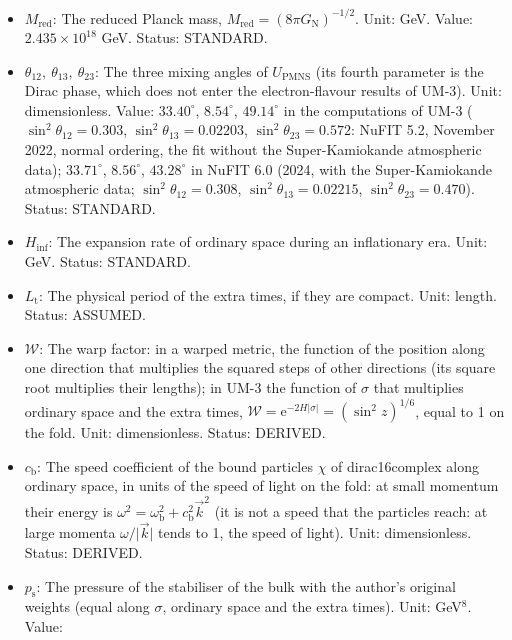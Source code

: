 \documentclass[
  10pt,
]{article}
\providecommand{\tightlist}{%
  \setlength{\itemsep}{0pt}\setlength{\parskip}{0pt}}
\begin{document}
\begin{itemize}
\tightlist
\item
  \(M_{\mathrm{red}}\): The reduced Planck mass,
  \(M_{\mathrm{red}} = (8\pi G_{\mathrm{N}})^{-1/2}\). Unit: GeV. Value:
  \(2.435\times10^{18}\) GeV. Status: STANDARD.
\item
  \(\theta_{12},\ \theta_{13},\ \theta_{23}\): The three mixing angles
  of \(U_{\mathrm{PMNS}}\) (its fourth parameter is the Dirac phase,
  which does not enter the electron-flavour results of UM-3). Unit:
  dimensionless. Value: \(33.40^\circ\), \(8.54^\circ\), \(49.14^\circ\)
  in the computations of UM-3 (\(\sin^2\theta_{12} = 0.303\),
  \(\sin^2\theta_{13} = 0.02203\), \(\sin^2\theta_{23} = 0.572\): NuFIT
  5.2, November 2022, normal ordering, the fit without the
  Super-Kamiokande atmospheric data); \(33.71^\circ\), \(8.56^\circ\),
  \(43.28^\circ\) in NuFIT 6.0 (2024, with the Super-Kamiokande
  atmospheric data; \(\sin^2\theta_{12} = 0.308\),
  \(\sin^2\theta_{13} = 0.02215\), \(\sin^2\theta_{23} = 0.470\)).
  Status: STANDARD.
\item
  \(H_{\mathrm{inf}}\): The expansion rate of ordinary space during an
  inflationary era. Unit: GeV. Status: STANDARD.
\item
  \(L_{\mathrm{t}}\): The physical period of the extra times, if they
  are compact. Unit: length. Status: ASSUMED.
\item
  \(\mathcal{W}\): The warp factor: in a warped metric, the function of
  the position along one direction that multiplies the squared steps of
  other directions (its square root multiplies their lengths); in UM-3
  the function of \(\sigma\) that multiplies ordinary space and the
  extra times,
  \(\mathcal{W} = \mathrm{e}^{-2H\lvert\sigma\rvert} = (\sin^2z)^{1/6}\),
  equal to 1 on the fold. Unit: dimensionless. Status: DERIVED.
\item
  \(c_{\mathrm{b}}\): The speed coefficient of the bound particles
  \(\chi\) of dirac16complex along ordinary space, in units of the speed
  of light on the fold: at small momentum their energy is
  \(\omega^2 = \omega_{\mathrm{b}}^2 + c_{\mathrm{b}}^2\vec k^2\) (it is
  not a speed that the particles reach: at large momenta
  \(\omega/\lvert\vec k\rvert\) tends to 1, the speed of light). Unit:
  dimensionless. Status: DERIVED.
\item
  \(p_{\mathrm{s}}\): The pressure of the stabiliser of the bulk with
  the author's original weights (equal along \(\sigma\), ordinary space
  and the extra times). Unit: GeV\(^8\). Value:

\end{itemize}
\end{document}
